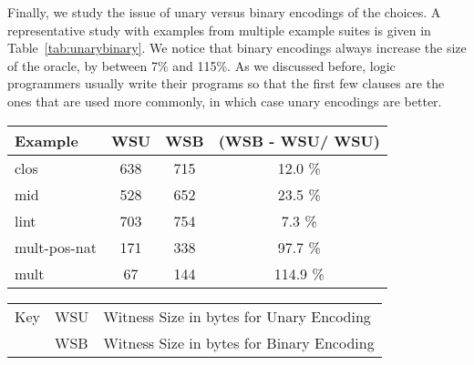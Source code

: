 \documentclass{llncs}
\begin{document}
Finally, we study the issue of unary versus binary encodings of the choices.
A representative study with examples from multiple example suites is given
in Table~\ref{tab:unarybinary}. We notice that binary encodings always 
increase the size of the oracle, by between 7\% and 115\%. As we discussed
before, logic programmers usually write their programs so that the first
few clauses are the ones that are used more commonly, in which case unary 
encodings are better.

\begin{table*}[htbp]
\begin{center}
\begin{small}
\begin{tabular}{|l|c|c|c|}
\hline
Example & WSU & WSB & (WSB - WSU/ WSU) \\
\hline
clos & 638 & 715 & 12.0 \%\\
mid & 528 & 652 & 23.5 \%\\
lint & 703 & 754 & 7.3 \%\\
mult-pos-nat & 171 & 338 & 97.7 \%\\
mult & 67 & 144 & 114.9 \%\\
\hline
\end{tabular}
\begin{tabular}{ll@{=}l}
Key & WSU & Witness Size in bytes for Unary Encoding\\
&WSB & Witness Size in bytes for Binary Encoding\\
\end{tabular} 
\end{small}
\end{center}
\caption{\label{tab:unarybinary}
Unary versus Binary Encodings: no Caching}
\end{table*}
\end{document}
